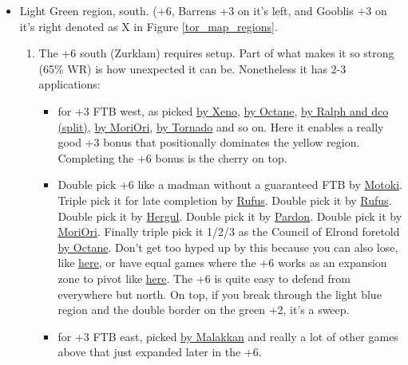\begin{itemize}
    \item Light Green region, south. (+6, Barrens +3 on it's left, and Gooblis +3 on it's right denoted as X in Figure \ref{tor_map_regions}.
    \begin{enumerate}
        \item The +6 south (Zurklam) requires setup. Part of what makes it so strong (65\% WR) is how unexpected it can be. Nonetheless it has 2-3 applications:
        \begin{itemize}
            \item for +3 FTB west, as picked \href{https://www.warzone.com/MultiPlayer?GameID=38576669}{by Xeno}, \href{https://www.warzone.com/MultiPlayer?GameID=38447615}{by Octane}, \href{https://www.warzone.com/MultiPlayer?GameID=38219182}{by Ralph and dco (split)}, \href{https://www.warzone.com/MultiPlayer?GameID=33511153}{by MoriOri}, \href{https://www.warzone.com/MultiPlayer?GameID=33424922}{by Tornado} and so on. Here it enables a really good +3 bonus that positionally dominates the yellow region. Completing the +6 bonus is the cherry on top.
            \item Double pick +6 like a madman without a guaranteed FTB by \href{https://www.warzone.com/MultiPlayer?GameID=38392177}{Motoki}. Triple pick it for late completion by \href{https://www.warzone.com/MultiPlayer?GameID=15394482}{Rufus}. Double pick it by \href{https://www.warzone.com/MultiPlayer?GameID=15500423}{Rufus}. Double pick it by \href{https://www.warzone.com/MultiPlayer?GameID=23867584}{Hergul}. Double pick it by \href{https://www.warzone.com/MultiPlayer?GameID=22558622}{Pardon}. Double pick it by \href{https://www.warzone.com/MultiPlayer?GameID=33047568}{MoriOri}. Finally triple pick it 1/2/3 as the Council of Elrond foretold \href{https://www.warzone.com/MultiPlayer?GameID=29773723}{by Octane}. Don't get too hyped up by this because you can also lose, like \href{https://www.warzone.com/MultiPlayer?GameID=36705616}{here}, or have equal games where the +6 works as an expansion zone to pivot like \href{https://www.warzone.com/MultiPlayer?GameID=32661070}{here}. The +6 is quite easy to defend from everywhere but north. On top, if you break through the light blue region and the double border on the green +2, it's a sweep.
            \item for +3 FTB east, picked \href{https://www.warzone.com/MultiPlayer?GameID=37592745}{by Malakkan} and really a lot of other games above that just expanded later in the +6.
        \end{itemize}

\end{enumerate}
\end{itemize}
